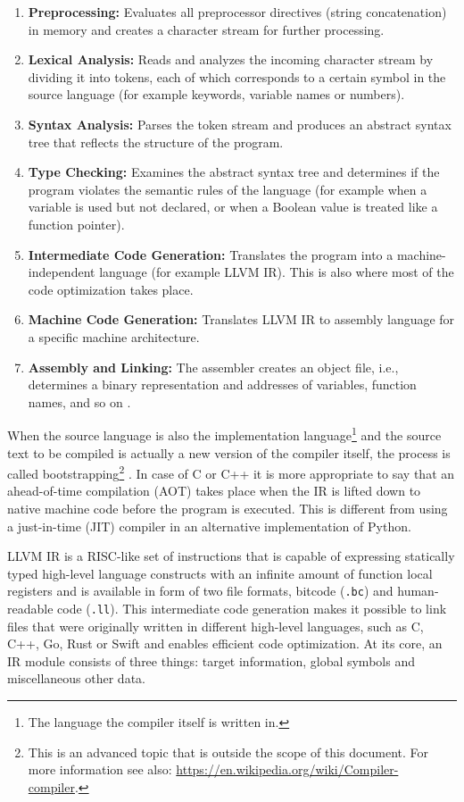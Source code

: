 \begin{enumerate}
    \item \textbf{Preprocessing:} Evaluates all preprocessor directives (string
    concatenation) in memory and creates a character stream for further processing.
    \item \textbf{Lexical Analysis:} Reads and analyzes the incoming character
    stream by dividing it into tokens, each of which corresponds to a certain symbol
    in the source language (for example keywords, variable names or numbers). 
    \item \textbf{Syntax Analysis:} Parses the token stream and produces an abstract
    syntax tree that reflects the structure of the program.
    \item \textbf{Type Checking:} Examines the abstract syntax tree and determines
    if the program violates the semantic rules of the language (for example when
    a variable is used but not declared, or when a Boolean value is treated like
    a function pointer).
    \item \textbf{Intermediate Code Generation:} Translates the program into a
    machine-independent language (for example LLVM IR). This is also where most
    of the code optimization takes place.
    \item \textbf{Machine Code Generation:} Translates LLVM IR to assembly language
    for a specific machine architecture.
    \item \textbf{Assembly and Linking:} The assembler creates an object file,
    i.e., determines a binary representation and addresses of variables, function
    names, and so on \autocite{mogensen2010}.
\end{enumerate}

When the source language is also the implementation language\footnote{The language
the compiler itself is written in.} and the source text to be compiled is actually
a new version of the compiler itself, the process is called bootstrapping\footnote{This
is an advanced topic that is outside the scope of this document. For more information
see also: \url{https://en.wikipedia.org/wiki/Compiler-compiler}.} \autocite{grune2012}.
In case of C or C++ it is more appropriate to say that an ahead-of-time compilation
(AOT) takes place when the IR is lifted down to native machine code before the program
is executed. This is different from using a just-in-time (JIT) compiler in an alternative
implementation of Python.

LLVM IR is a RISC-like set of instructions that is capable of expressing statically
typed high-level language constructs with an infinite amount of function local
registers and is available in form of two file formats, bitcode (\texttt{.bc}) and
human-readable code (\texttt{.ll}). This intermediate code generation makes it
possible to link files that were originally written in different high-level languages,
such as C, C++, Go, Rust or Swift and enables efficient code optimization. At its
core, an IR module consists of three things: target information, global symbols
and miscellaneous other data.


